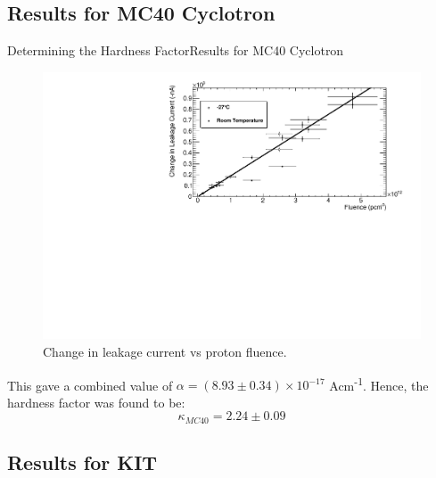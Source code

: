 \documentclass{beamer}
\begin{document}
\subsection{Results for MC40 Cyclotron}

    \begin{frame}{Determining the Hardness Factor}{Results for MC40 Cyclotron}
        \begin{figure}
            \centering
            \includegraphics[width = 0.85\linewidth]{HardnessFactor_FinalResult_1Fit_0603.pdf}
            \caption{Change in leakage current vs proton fluence.}
        \end{figure}
        \vspace{-0.5cm}
        This gave a combined value of $\alpha = (8.93\pm 0.34)\times 10^{-17}$ Acm\textsuperscript{-1}. Hence, the hardness factor was found to be:
            \begin{equation*}
                \boxed{\kappa _{MC40} = 2.24\pm 0.09}
            \end{equation*}
    \end{frame}
    
\subsection{Results for KIT}
    
\end{document}

